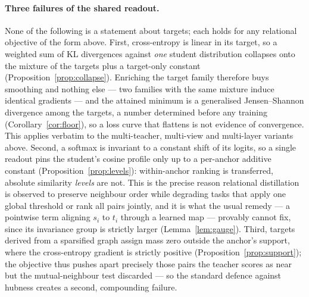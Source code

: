 \paragraph{Three failures of the shared readout.}
None of the following is a statement about targets; each holds for any relational objective
of the form above. First, cross-entropy is linear in its target, so a weighted sum of KL
divergences against \emph{one} student distribution collapses onto the mixture of the
targets plus a target-only constant (Proposition~\ref{prop:collapse}). Enriching the target
family therefore buys smoothing and nothing else --- two families with the same mixture
induce identical gradients --- and the attained minimum is a generalised Jensen--Shannon
divergence among the targets, a number determined before any training
(Corollary~\ref{cor:floor}), so a loss curve that flattens is not evidence of convergence.
This applies verbatim to the multi-teacher, multi-view and multi-layer variants above.
Second, a softmax is invariant to a constant shift of its logits, so a single readout pins
the student's cosine profile only up to a per-anchor additive constant
(Proposition~\ref{prop:levels}): within-anchor ranking is transferred, absolute similarity
\emph{levels} are not. This is the precise reason relational distillation is observed to
preserve neighbour order while degrading tasks that apply one global threshold or rank all
pairs jointly, and it is what the usual remedy --- a pointwise term aligning $s_i$ to $t_i$
through a learned map --- provably cannot fix, since its invariance group is strictly larger
(Lemma~\ref{lem:gauge}). Third, targets derived from a sparsified graph assign mass zero
outside the anchor's support, where the cross-entropy gradient is strictly positive
(Proposition~\ref{prop:support}); the objective thus pushes apart precisely those pairs the
teacher scores as near but the mutual-neighbour test discarded --- so the standard defence
against hubness \citep{radovanovic2010hubs} creates a second, compounding failure.

